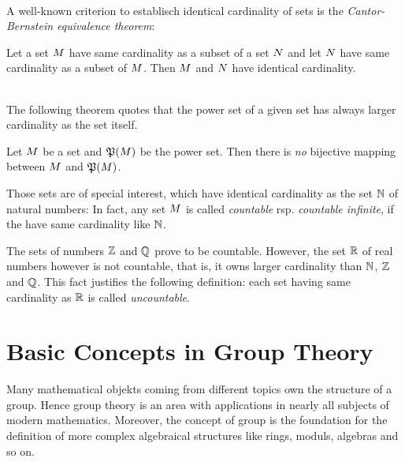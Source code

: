 \documentclass[11pt,twoside]{article}
\begin{document}
\paragraph{}
A well-known criterion to establisch identical cardinality of sets
is the \textit{Cantor-Bernstein equivalence theorem}:

\begin{theorem}
Let a set $M$ have same cardinality as a subset of a set $N$
and let $N$ have same cardinality as a subset of $M$.
Then $M$ and $N$ have identical cardinality.
\end{theorem}

\paragraph{}
The following theorem quotes
that the power set of a given set has always larger cardinality
as the set itself.

\begin{theorem}
Let $M$ be a set and $\mathfrak{P}(M) $ be the power set.
Then there is \textit{no} bijective mapping
between $M$ and $\mathfrak{P}(M) $.
\end{theorem}

\subparagraph{}
Those sets are of special interest,
which have identical cardinality as the set ${\mathbb{N}}$ of natural numbers:
In fact,
any set $M$ is called \textit{countable} rsp. \textit{countable infinite},
if the have same cardinality like ${\mathbb{N}}$.

\subparagraph{}
The sets of numbers ${\mathbb{Z}}$ and ${\mathbb{Q}}$ prove to be countable.
However,
the set ${\mathbb{R}}$ of real numbers however is not countable,
that is,
it owns larger cardinality than ${\mathbb{N}}$, ${\mathbb{Z}}$ and ${\mathbb{Q}}$.
This fact justifies the following definition:
each set having same cardinality as ${\mathbb{R}}$ is called \textit{uncountable}.

\part{Basic Concepts in Group Theory}                                          %
Many mathematical objekts coming from different topics
own the structure of a group.
Hence group theory is an area with applications in nearly all subjects of
modern mathematics.
Moreover,
the concept of group is the foundation for the definition of more complex
algebraical structures like rings, moduls, algebras and so on.
\end{document}
